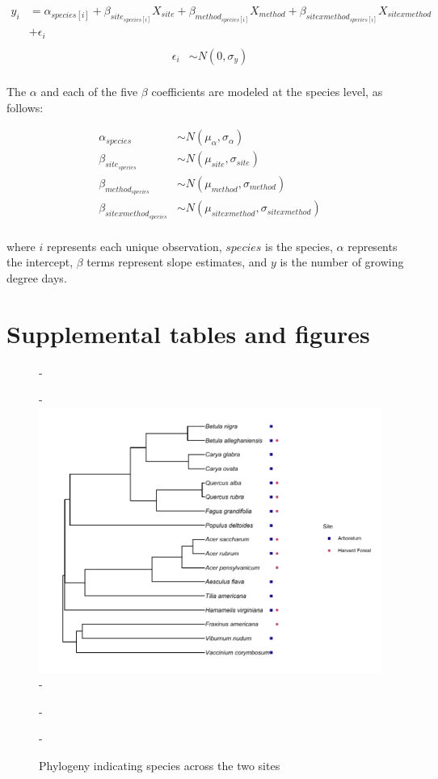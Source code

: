 \documentclass{article}\usepackage[]{graphicx}\usepackage[]{color}
\begin{document}
\begin{align*}
y_i &= \alpha_{species[i]} + \beta_{site_{species[i]}}X_{site} + \beta_{method_{species[i]}}X_{method} + \beta_{sitexmethod_{species[i]}}X_{sitexmethod}\\
&+ \epsilon_i \tag{1}\\
\end{align*}
\begin{align*}
\epsilon_i & \sim N(0,\sigma_y) \\
\end{align*}

The $\alpha$ and each of the five $\beta$ coefficients are modeled at the species level, as follows:

\begin{align*}
\alpha_{species} & \sim N(\mu_{\alpha}, \sigma_{\alpha}) \\
\beta_{site_{species}} & \sim N(\mu_{site}, \sigma_{site}) \\
\beta_{method_{species}} & \sim N(\mu_{method}, \sigma_{method}) \\
\beta_{sitexmethod_{species}} & \sim N(\mu_{sitexmethod}, \sigma_{sitexmethod}) \\
\end{align*}

where $i$ represents each unique observation, $species$ is the species, $\alpha$ represents the intercept, $\beta$ terms represent slope estimates, and $y$ is the number of growing degree days. 




\section*{Supplemental tables and figures}

{\begin{figure} [H]
  -\begin{center}
  -\includegraphics[width=12cm]{..//phylodata/microtree_hfandts.pdf}
  -\caption{Phylogeny indicating species across the two sites}\label{fig:phylo}
  -\end{center}
  -\end{figure}}
\end{document}
